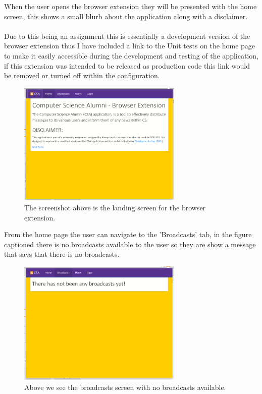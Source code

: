 \documentclass{article}
\begin{document}
When the user opens the browser extension they will be presented with the home screen, this shows a small blurb about the application along with a disclaimer.\\
\\
Due to this being an assignment this is essentially a development version of the browser extension thus I have included a link to the Unit tests on the home page to make it easily accessible during the development and testing of the application, if this extension was intended to be released as production code this link would be removed or turned off within the configuration.\\

\begin{figure}[H]
\centering
\includegraphics[width=0.7\textwidth]{homepage}
\caption{The screenshot above is the landing screen for the browser extension.}
\end{figure}

\newpage
From the home page the user can navigate to the 'Broadcasts' tab, in the figure captioned there is no broadcasts available to the user so they are show a message that says that there is no broadcasts.\\

\begin{figure}[H]
\centering
\includegraphics[width=0.7\textwidth]{bcpage}
\caption{Above we see the broadcasts screen with no broadcasts available.}
\end{figure}
\end{document}
